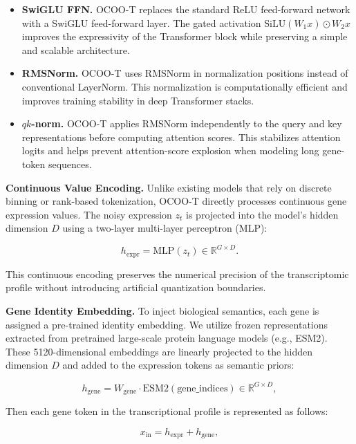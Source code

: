 \documentclass[11pt]{article}
\begin{document}
\begin{itemize}
  \item \textbf{SwiGLU FFN.} OCOO-T replaces the standard ReLU feed-forward network with a SwiGLU feed-forward layer. The gated activation $\mathrm{SiLU}(W_1 x) \odot W_2 x$ improves the expressivity of the Transformer block while preserving a simple and scalable architecture.
  \item \textbf{RMSNorm.} OCOO-T uses RMSNorm in normalization positions instead of conventional LayerNorm. This normalization is computationally efficient and improves training stability in deep Transformer stacks.
  \item \textbf{$qk$-norm.} OCOO-T applies RMSNorm independently to the query and key representations before computing attention scores. This stabilizes attention logits and helps prevent attention-score explosion when modeling long gene-token sequences.
\end{itemize}

\textbf{Continuous Value Encoding.} Unlike existing models that rely on discrete binning or rank-based tokenization, OCOO-T directly processes continuous gene expression values. The noisy expression $z_t$ is projected into the model's hidden dimension $D$ using a two-layer multi-layer perceptron (MLP):

\begin{equation}
  h_{\mathrm{expr}} = \mathrm{MLP}(z_t) \in \mathbb{R}^{G \times D}.
\end{equation}

This continuous encoding preserves the numerical precision of the transcriptomic profile without introducing artificial quantization boundaries.

\textbf{Gene Identity Embedding.} To inject biological semantics, each gene is assigned a pre-trained identity embedding. We utilize frozen representations extracted from pretrained large-scale protein language models (e.g., ESM2). These 5120-dimensional embeddings are linearly projected to the hidden dimension $D$ and added to the expression tokens as semantic priors:

\begin{equation}
  h_{\mathrm{gene}} = W_{\mathrm{gene}} \cdot \mathrm{ESM2}(\mathrm{gene\_indices}) \in \mathbb{R}^{G \times D},
\end{equation}

Then each gene token in the transcriptional profile is represented as follows:

\begin{equation}
  x_{\mathrm{in}} = h_{\mathrm{expr}} + h_{\mathrm{gene}},
\end{equation}
\end{document}

